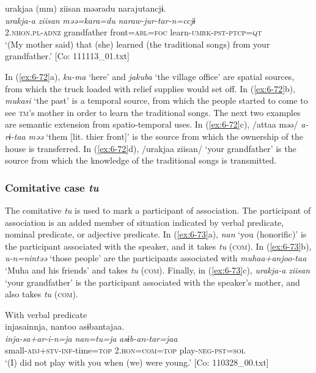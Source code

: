 \ex
{\TM}
\glll  urakjaa  (mm)  ziisan  məəradu narajutancjɨ.\\
\textit{urakja-a}    \textit{ziisan}  \textit{məə=kara=du}     \textit{naraw-jur-tar-n=ccjɨ}\\
2.\textsc{nhon}.\textsc{pl}-\textsc{adnz}    grandfather  front=\textsc{abl}=\textsc{foc}   learn-\textsc{umrk}-\textsc{pst}-\textsc{ptcp}=\textsc{qt}\\
\glt ‘(My mother said) that (she) learned (the traditional songs) from your grandfather.’ [Co: 111113\_01.txt]
\z
\z

In (\ref{ex:6-72}a), \textit{ku-ma} ‘here’ and \textit{jakuba} ‘the village office’ are spatial sources, from which the truck loaded with relief supplies would set off. In (\ref{ex:6-72}b), \textit{mukasi} ‘the past’ is a temporal source, from which the people started to come to see \textsc{tm}’s mother in order to learn the traditional songs. The next two examples are semantic extension from spatio-temporal uses. In (\ref{ex:6-72}c), /attaa məə/ \textit{a-rɨ-taa} \textit{məə} ‘them [lit. thier front]’ is the source from which the ownership of the house is transferred. In (\ref{ex:6-72}d), /urakjaa ziisan/ ‘your grandfather’ is the source from which the knowledge of the traditional songs is transmitted.

\subsubsection{ Comitative case \textit{tu}}

The comitative \textit{tu} is used to mark a participant of association. The participant of association is an added member of situation indicated by verbal predicate, nominal predicate, or adjective predicate. In (\ref{ex:6-73}a), \textit{nan} ‘you (honorific)’ is the participant associated with the speaker, and it takes \textit{tu} (\textsc{com}). In (\ref{ex:6-73}b), \textit{u-n=nintəə} ‘those people’ are the participants associated with \textit{muhaa+anjoo-taa} ‘Muha and his friends’ and takes \textit{tu} (\textsc{com}). Finally, in (\ref{ex:6-73}c), \textit{urakja-a} \textit{ziisan} ‘your grandfather’ is the participant associated with the speaker’s mother, and also takes \textit{tu} (\textsc{com}).

\ea\label{ex:6-73}
\ea With verbal predicate\\
{\TM}
\glll  injasainnja,  nantoo  asɨbantajaa.\\
\textit{inja-sa+ar-i-n=ja}  \textit{nan=tu=ja}  \textit{asɨb-an-tar=jaa}\\
small-\textsc{adj}+\textsc{stv}-\textsc{inf}-time=\textsc{top}  2.\textsc{hon}=\textsc{com}=\textsc{top}  play-\textsc{neg}-\textsc{pst}=\textsc{sol}\\
\glt ‘(I) did not play with you when (we) were young.’ [Co: 110328\_00.txt]

